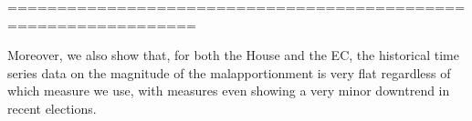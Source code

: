             ================================================================= %
   
   
   Moreover, we also show that, for both the House and the EC, the historical time series data on the magnitude of the malapportionment is very flat regardless of which measure we use, with  measures even showing a very minor downtrend in recent elections.
   
   
   
   
  
